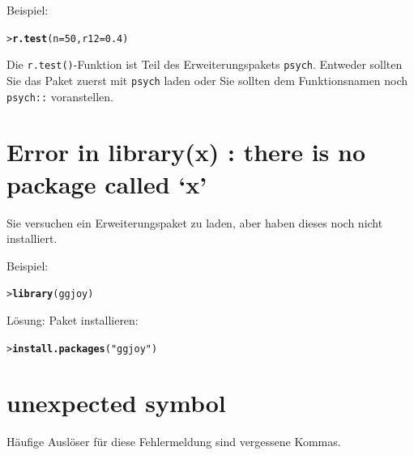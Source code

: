 \documentclass[oneside, 10pt]{book}\usepackage[]{graphicx}\usepackage[]{xcolor}
\makeatletter
\newcommand{\hlnum}[1]{\textcolor[rgb]{0.686,0.059,0.569}{#1}}%
\newcommand{\hlstr}[1]{\textcolor[rgb]{0.192,0.494,0.8}{#1}}%
\newcommand{\hlstd}[1]{\textcolor[rgb]{0.345,0.345,0.345}{#1}}%
\newcommand{\hlkwc}[1]{\textcolor[rgb]{0.333,0.667,0.333}{#1}}%
\newcommand{\hlkwd}[1]{\textcolor[rgb]{0.737,0.353,0.396}{\textbf{#1}}}%
\newenvironment{kframe}{%
 \def\at@end@of@kframe{}%
 \ifinner\ifhmode%
  \def\at@end@of@kframe{\end{minipage}}%
  \begin{minipage}{\columnwidth}%
 \fi\fi%
 \def\FrameCommand##1{\hskip\@totalleftmargin \hskip-\fboxsep
 \colorbox{shadecolor}{##1}\hskip-\fboxsep
     \hskip-\linewidth \hskip-\@totalleftmargin \hskip\columnwidth}%
 \MakeFramed {\advance\hsize-\width
   \@totalleftmargin\z@ \linewidth\hsize
   \@setminipage}}%
 {\par\unskip\endMakeFramed%
 \at@end@of@kframe}
\newenvironment{knitrout}{}{} %
\makeatother
\begin{document}
Beispiel:
\begin{knitrout}
\color{fgcolor}\begin{kframe}
\begin{alltt}
\hlstd{> }\hlkwd{r.test}\hlstd{(}\hlkwc{n} \hlstd{=} \hlnum{50}\hlstd{,} \hlkwc{r12} \hlstd{=} \hlnum{0.4}\hlstd{)}
\end{alltt}


{\ttfamily\noindent\bfseries{}}\end{kframe}
\end{knitrout}

Die \texttt{r.test()}-Funktion ist Teil
des Erweiterungspakets \texttt{psych}. 
Entweder sollten Sie das Paket zuerst
mit \texttt{psych} laden
oder Sie sollten dem Funktionsnamen
noch \texttt{psych::} voranstellen.

\section*{Error in library(x) : there is no package called `x'}
Sie versuchen ein Erweiterungspaket zu laden,
aber haben dieses noch nicht installiert.

Beispiel:
\begin{knitrout}
\color{fgcolor}\begin{kframe}
\begin{alltt}
\hlstd{> }\hlkwd{library}\hlstd{(ggjoy)}
\end{alltt}


{\ttfamily\noindent\bfseries\color{errorcolor}{Error in library(ggjoy): there is no package called 'ggjoy'}}\end{kframe}
\end{knitrout}

Lösung: Paket installieren:
\begin{knitrout}
\color{fgcolor}\begin{kframe}
\begin{alltt}
\hlstd{> }\hlkwd{install.packages}\hlstd{(}\hlstr{"ggjoy"}\hlstd{)}
\end{alltt}
\end{kframe}
\end{knitrout}

\section*{unexpected symbol}
Häufige Auslöser für diese Fehlermeldung
sind vergessene Kommas.
\end{document}
